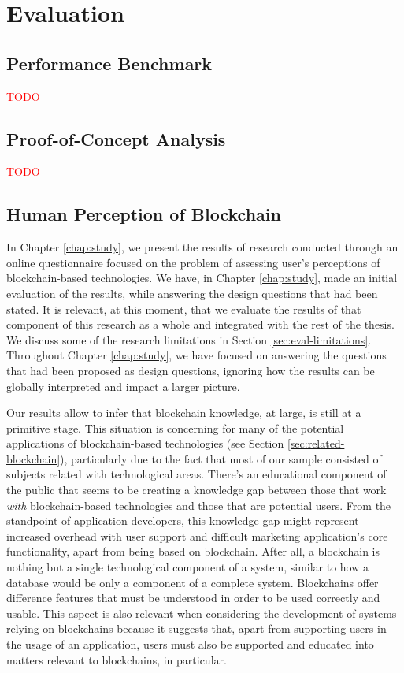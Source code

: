 \chapter{Evaluation}
\label{chap:evaluation}

\section{Performance Benchmark}
\label{sec:eval-benchmark}

\textcolor{red}{TODO}

\section{Proof-of-Concept Analysis} 

\textcolor{red}{TODO}

\section{Human Perception of Blockchain}

In Chapter \ref{chap:study}, we present the results of research conducted through an online questionnaire focused on the problem of assessing user's perceptions of blockchain-based technologies. We have, in Chapter \ref{chap:study}, made an initial evaluation of the results, while answering the design questions that had been stated. It is relevant, at this moment, that we evaluate the results of that component of this research as a whole and integrated with the rest of the thesis. We discuss some of the research limitations in Section \ref{sec:eval-limitations}. Throughout Chapter \ref{chap:study}, we have focused on answering the questions that had been proposed as design questions, ignoring how the results can be globally interpreted and impact a larger picture.

Our results allow to infer that blockchain knowledge, at large, is still at a primitive stage. This situation is concerning for many of the potential applications of blockchain-based technologies (see Section \ref{sec:related-blockchain}), particularly due to the fact that most of our sample consisted of subjects related with technological areas. There's an educational component of the public that seems to be creating a knowledge gap between those that work \emph{with} blockchain-based technologies and those that are potential users. From the standpoint of application developers, this knowledge gap might represent increased overhead with user support and difficult marketing application's core functionality, apart from being based on blockchain. After all, a blockchain is nothing but a single technological component of a system, similar to how a database would be only a component of a complete system. Blockchains offer difference features that must be understood in order to be used correctly and usable. This aspect is also relevant when considering the development of systems relying on blockchains because it suggests that, apart from supporting users in the usage of an application, users must also be supported and educated into matters relevant to blockchains, in particular.

